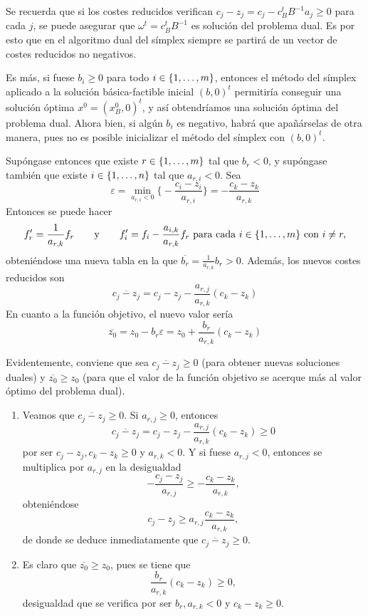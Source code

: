 \documentclass[11pt]{report}
\theoremstyle{mytheorem}
\theoremstyle{mydefinition}
\theoremstyle{myexample}
\begin{document}
Se recuerda que si los costes reducidos verifican $c_j-z_j = c_j-c_B^tB^{-1}a_j \geq 0$ para cada $j$, se puede asegurar que $\omega^t = c_B^tB^{-1}$ es solución del problema dual. Es por esto que en el algoritmo dual del símplex siempre se partirá de un vector de costes reducidos no negativos.



Es más, si fuese $b_i \geq 0$ para todo $i \in \{1,\mathellipsis,m\}$, entonces el método del símplex aplicado a la solución básica-factible inicial $(b,0)^t$ permitiría conseguir una solución óptima $x^0 = (x^0_B,0)^t$, y así obtendríamos una solución óptima del problema dual. Ahora bien, si algún $b_i$ es negativo, habrá que apañárselas de otra manera, pues no es posible inicializar el método del símplex con $(b,0)^t$. 



Supóngase entonces que existe $r \in \{1,\mathellipsis, m\}$ tal que $b_r < 0$, y supóngase también que existe $i \in \{1,\mathellipsis,n\}$ tal que $a_{r,i} <0$. Sea
    \[\varepsilon = \min_{a_{r,i}<0} \biggl\{-\frac{c_i-z_i}{a_{r,i}}\biggr\} = -\frac{c_k-z_k}{a_{r,k}}\]
    Entonces se puede hacer
    \[f_r' = \frac{1}{a_{r,k}}f_r \qquad \textup{y} \qquad f_i' = f_i -\frac{a_{i,k}}{a_{r,k}}f_r \textup{ para cada } i \in \{1,\mathellipsis,m\} \textup{ con } i \neq r,\]
    obteniéndose una nueva tabla en la que $\overline{b_r} = \frac{1}{a_{r,k}}b_r > 0$. Además, los nuevos costes reducidos son
    \[\overline{c_j-z_j} = c_j-z_j-\frac{a_{r,j}}{a_{r,k}}(c_k-z_k)\]
    En cuanto a la función objetivo, el nuevo valor sería
    \[\overline{z_0} = z_0-b_r\varepsilon = z_0+\frac{b_r}{a_{r,k}}(c_k-z_k) \tag{$*$}\]
    
    Evidentemente, conviene que sea $\overline{c_j-z_j} \geq 0$ (para obtener nuevas soluciones duales) y $\overline{z_0} \geq z_0$ (para que el valor de la función objetivo se acerque más al valor óptimo del problema dual). 
    \begin{enumerate}
    \item Veamos que $\overline{c_j-z_j} \geq 0$. Si $a_{r,j} \geq 0$, entonces
    \[\overline{c_j-z_j} = c_j-z_j-\frac{a_{r,j}}{a_{r,k}}(c_k-z_k) \geq 0\]
    por ser $c_j-z_j, c_k-z_k \geq 0$ y $a_{r,k} < 0$. Y si fuese $a_{r,j} < 0$, entonces se multiplica por $a_{r,j}$ en la desigualdad
    \[-\frac{c_j-z_j}{a_{r,j}} \geq -\frac{c_k-z_k}{a_{r,k}},\]
    obteniéndose
    \[c_j-z_j \geq a_{r,j} \frac{c_k-z_k}{a_{r,k}},\]
    de donde se deduce inmediatamente que $\overline{c_j-z_j} \geq 0$.
    \item Es claro que $\overline{z_0} \geq z_0$, pues se tiene que
    \[\frac{b_r}{a_{r,k}}(c_k-z_k) \geq 0,\]
    desigualdad que se verifica por ser $b_r, a_{r,k} <0$ y $c_k-z_k \geq 0$.
    \end{enumerate}
    
\end{document}
